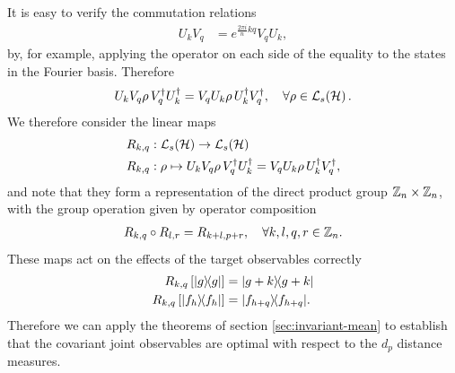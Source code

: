 It is easy to verify the commutation relations
\begin{align}
  U_k V_q  &= e^{\frac{2\pi i}{n} kq}  V_q U_k,
\end{align}
by, for example, applying the operator on each side of the equality to the states in the Fourier basis. Therefore
\begin{align}
  U_k V_q \rho\, V_q^\dagger U^\dagger_k = V_q U_k \rho\,  U^\dagger_k V_q^\dagger, \quad \forall \rho\in\saops[\hcal].
\end{align}
We therefore consider the linear maps
\begin{align}
  R_{k,q}&:\saops[\hcal]\to \saops[\hcal]\\
  R_{k,q}&:\rho \mapsto U_k V_q \rho\, V^\dagger_q U^\dagger_k =  V_q U_k  \rho\,  U^\dagger_k V^\dagger_q,
\end{align}
and note that they form a representation of the direct product group $\cyc[n]\times\cyc[n]$, with the group operation given by operator composition
\begin{align}
  R_{k,q} \circ R_{l,r} = R_{k+l, p+r}, \quad \forall k,l,q,r\in \cyc[n].
\end{align}
These maps act on the effects of the target observables correctly
\begin{align}
  R_{k,q}\left[|g\rangle\!\langle g|\right] &=  |g+k\rangle\!\langle g+k|\\
  R_{k,q}\left[|f_h\rangle\!\langle f_h|\right] &=  |f_{h+q}\rangle\!\langle f_{h+q}|.
\end{align}
Therefore we can apply the theorems of section \ref{sec:invariant-mean} to establish that the covariant joint observables are optimal with respect to the $d_p$ distance measures.

